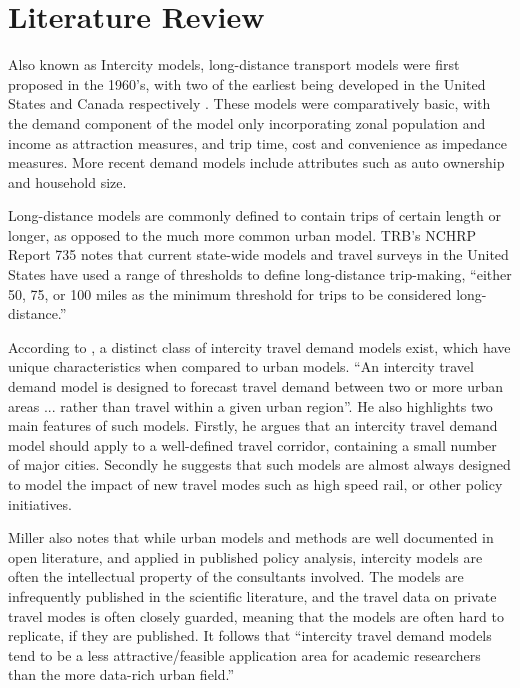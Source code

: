 \chapter{Literature Review}
\label{section:lit-review}
Also known as Intercity models, long-distance transport models were first proposed in the 1960’s, with two of the earliest being developed in the United States and Canada respectively \parencite{CTC71}. These models were comparatively basic, with the demand component of the model only incorporating zonal population and income as attraction measures, and trip time, cost and convenience as impedance measures. More recent demand models include attributes such as auto ownership and household size. 

Long-distance models are commonly defined to contain trips of certain length or longer, as opposed to the much more common urban model. TRB's NCHRP Report 735 notes that current state-wide models and travel surveys in the United States have used a range of thresholds to define long-distance trip-making, \enquote{either 50, 75, or 100 miles as the minimum threshold for trips to be considered long-distance.}\autocite{schif12}

According to \textcite{miller04}, a distinct class of intercity travel demand models exist, which have unique characteristics when compared to urban models. \enquote{An intercity travel demand model is designed to forecast travel demand between two or more urban areas ... rather than travel within a given urban region}. He also highlights two main features of such models. Firstly, he argues that an intercity travel demand model should apply to a well-defined travel corridor, containing a small number of major cities. Secondly he suggests that such models are almost always designed to model the impact of new travel modes such as high speed rail, or other policy initiatives.

Miller also notes that while urban models and methods are well documented in open literature, and applied in published policy analysis, intercity models are often the intellectual property of the consultants involved. The models are infrequently published in the scientific literature, and the travel data on private travel modes is often closely guarded, meaning that the models are often hard to replicate, if they are published. It follows that \enquote{intercity travel demand models tend to be a less attractive/feasible application area for academic researchers than the more data-rich urban field.} \parencite{miller04}

